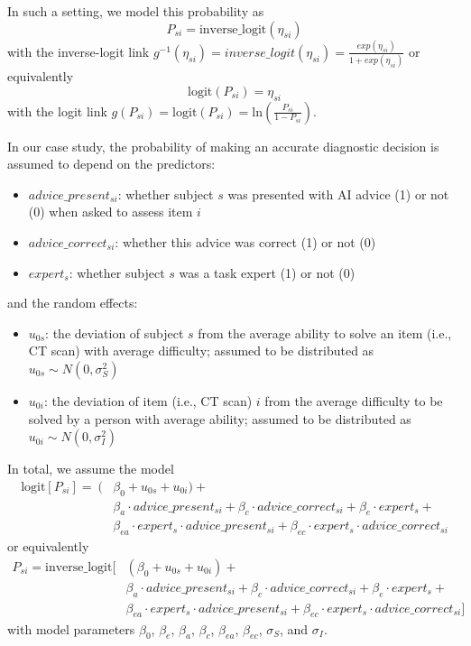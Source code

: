 \documentclass[
  man,
  floatsintext,
  longtable,
  a4paper,
  nolmodern,
  notxfonts,
  notimes,
  colorlinks=true,linkcolor=blue,citecolor=blue,urlcolor=blue]{apa7}
\providecommand{\tightlist}{%
  \setlength{\itemsep}{0pt}\setlength{\parskip}{0pt}}
\begin{document}
In such a setting, we model this probability as \[
P_{si} = \text{inverse\_logit}(\eta_{si})
\] with the inverse-logit link
\(g^{-1}(\eta_{si}) = inverse\_logit(\eta_{si}) = \frac{exp(\eta_{si})}{1 + exp(\eta_{si})}\)
or equivalently \[
\text{logit}(P_{si}) = \eta_{si}
\] with the logit link
\(g(P_{si}) = \text{logit}(P_{si}) = \text{ln} (\frac{P_{si}}{1 - P_{si}})\).

In our case study, the probability of making an accurate diagnostic
decision is assumed to depend on the predictors:

\begin{itemize}
\tightlist
\item
  \(advice\_present_{si}\): whether subject \(s\) was presented with AI
  advice (1) or not (0) when asked to assess item \(i\)
\item
  \(advice\_correct_{si}\): whether this advice was correct (1) or not
  (0)
\item
  \(expert_s\): whether subject \(s\) was a task expert (1) or not (0)
\end{itemize}

and the random effects:

\begin{itemize}
\tightlist
\item
  \(u_{0s}\): the deviation of subject \(s\) from the average ability to
  solve an item (i.e., CT scan) with average difficulty; assumed to be
  distributed as \(u_{0s} \sim N(0, \sigma_S^2)\)
\item
  \(u_{0i}\): the deviation of item (i.e., CT scan) \(i\) from the
  average difficulty to be solved by a person with average ability;
  assumed to be distributed as \(u_{0i} \sim N(0, \sigma_I^2)\)
\end{itemize}

In total, we assume the model \[
\begin{aligned}
\text{logit}[P_{si}] =\ (&\beta_0 + u_{0s} + u_{0i}) + \\
&\beta_a \cdot advice\_present_{si} + \beta_c \cdot advice\_correct_{si} + \beta_e \cdot expert_s + \\
&\beta_{ea} \cdot expert_{s} \cdot advice\_present_{si} + \beta_{ec} \cdot expert_{s} \cdot advice\_correct_{si}
\end{aligned}
\] or equivalently \[
\begin{aligned}
P_{si} = \text{inverse\_logit}[&(\beta_0 + u_{0s} + u_{0i}) + \\
&\beta_a \cdot advice\_present_{si} + \beta_c \cdot advice\_correct_{si} + \beta_e \cdot expert_s + \\
&\beta_{ea} \cdot expert_{s} \cdot advice\_present_{si} + \beta_{ec} \cdot expert_{s} \cdot advice\_correct_{si}]
\end{aligned}
\] with model parameters \(\beta_0\), \(\beta_e\), \(\beta_a\),
\(\beta_c\), \(\beta_{ea}\), \(\beta_{ec}\), \(\sigma_S\), and
\(\sigma_I\).
\end{document}
